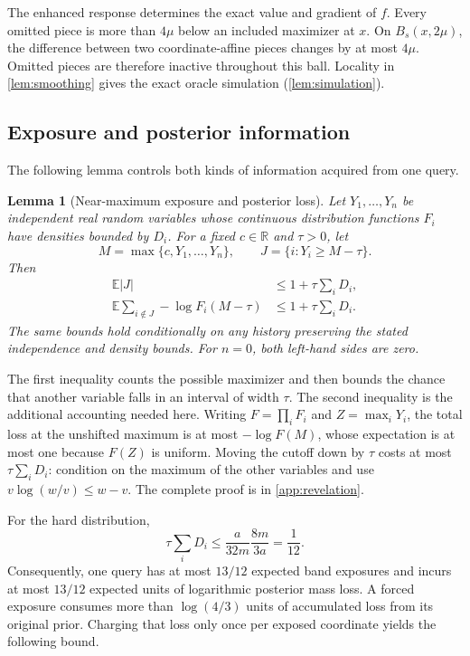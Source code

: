\documentclass[11pt]{article}
\newcommand{\R}{\mathbb{R}}
\newcommand{\E}{\mathbb{E}}
\newcommand{\abs}[1]{\left|#1\right|}
\newtheorem{lemma}[lemma]{Lemma}
\theoremstyle{definition}
\theoremstyle{remark}
\begin{document}
The enhanced response determines the exact value and gradient of
$f$. Every omitted piece is more than $4\mu$ below an included
maximizer at $x$. On $B_s(x,2\mu)$, the difference between two
coordinate-affine pieces changes by at most $4\mu$. Omitted pieces
are therefore inactive throughout this ball. Locality in
\cref{lem:smoothing} gives the exact oracle simulation
(\cref{lem:simulation}).

\subsection{Exposure and posterior information}

The following lemma controls both kinds of information acquired from
one query.

\begin{lemma}[Near-maximum exposure and posterior loss]
\label{lem:band}
Let $Y_1,\ldots,Y_n$ be independent real random variables whose
continuous distribution functions $F_i$ have densities bounded by
$D_i$. For a fixed $c\in\R$ and $\tau>0$, let
\[
 M=\max\{c,Y_1,\ldots,Y_n\},\qquad
 J=\{i:Y_i\ge M-\tau\}.
\]
Then
\begin{align}
 \E\abs{J}&\le1+\tau\sum_iD_i,
 \label{eq:band-count}\\
 \E\sum_{i\notin J}-\log F_i(M-\tau)
 &\le1+\tau\sum_iD_i.
 \label{eq:band-loss}
\end{align}
The same bounds hold conditionally on any history preserving the
stated independence and density bounds. For $n=0$, both left-hand
sides are zero.
\end{lemma}

The first inequality counts the possible maximizer and then bounds
the chance that another variable falls in an interval of width $\tau$.
The second inequality is the additional accounting needed here.
Writing $F=\prod_iF_i$ and $Z=\max_iY_i$, the total loss at the
unshifted maximum is at most $-\log F(M)$, whose expectation is at
most one because $F(Z)$ is uniform. Moving the cutoff down by $\tau$
costs at most $\tau\sum_iD_i$: condition on the maximum of the other
variables and use
$v\log(w/v)\le w-v$. The complete proof is in
\cref{app:revelation}.

For the hard distribution,
\begin{equation}
\label{eq:tauD}
 \tau\sum_iD_i\le\frac{a}{32m}\frac{8m}{3a}=\frac1{12}.
\end{equation}
Consequently, one query has at most $13/12$ expected band exposures
and incurs at most $13/12$ expected units of logarithmic posterior
mass loss. A forced exposure consumes more than $\log(4/3)$ units of
accumulated loss from its original prior. Charging that loss only
once per exposed coordinate yields the following bound.
\end{document}
